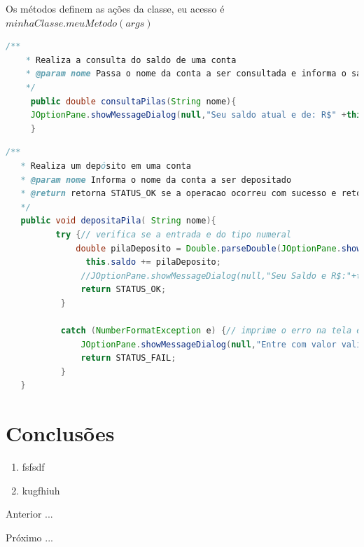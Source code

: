 \par Os métodos definem as ações da classe, eu acesso é $minhaClasse.meuMetodo(args)$

\begin{lstlisting}[language=Java, caption=consultaPilas, label=consultaPilas]
    /**
    * Realiza a consulta do saldo de uma conta
    * @param nome Passa o nome da conta a ser consultada e informa o saldo ao cliente.
    */
     public double consultaPilas(String nome){
     JOptionPane.showMessageDialog(null,"Seu saldo atual e de: R$" +this.saldo, this.nome+" "+this.sobrenome, JOptionPane.INFORMATION_MESSAGE, icon);
     }

\end{lstlisting}

\begin{lstlisting}[language=Java, caption=depositoPilas, label=depositaPilas]
  /**
   * Realiza um depósito em uma conta
   * @param nome Informa o nome da conta a ser depositado
   * @return retorna STATUS_OK se a operacao ocorreu com sucesso e retorna STATUS_FAIL se ocorrer um erro
   */
   public void depositaPila( String nome){
          try {// verifica se a entrada e do tipo numeral
              double pilaDeposito = Double.parseDouble(JOptionPane.showInputDialog(null,"Informe a quantidade em Reais (R$) a ser depositado na conta do "+this.nome+" "+this.sobrenome));
                this.saldo += pilaDeposito;
               //JOptionPane.showMessageDialog(null,"Seu Saldo e R$:"+this.consultaPilas(this.nome)+" Reais", this.nome, JOptionPane.INFORMATION_MESSAGE, icon);
               return STATUS_OK;
           }

           catch (NumberFormatException e) {// imprime o erro na tela e informa o que foi digitado.
               JOptionPane.showMessageDialog(null,"Entre com valor valido, do tipo numeral.\n Use (.) ponto em vez de (,) virgula\n ERRO: " + e.getMessage()  , "ERRO", JOptionPane.ERROR_MESSAGE);
               return STATUS_FAIL;
           }
   }
\end{lstlisting}




\section{Conclusões}


\begin{enumerate}[label=\Roman{*}, ref=(\roman{*})]
  \item fsfsdf
  \item kugfhiuh
\end{enumerate}

\begin{asparaenum}
\item Anterior ... \cite{ninguem2022curioso}
\item Próximo ... \label{pl1}
\end{asparaenum}


